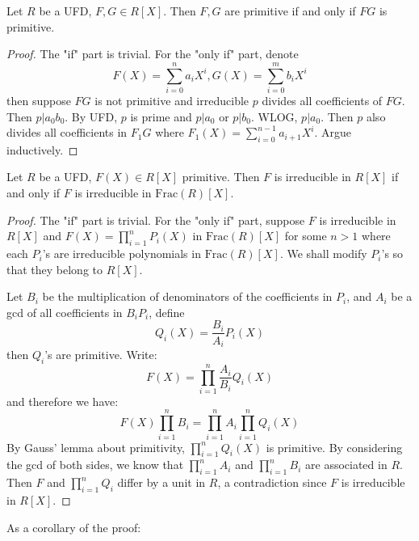 \documentclass{note-eng}
\begin{document}
\begin{lemma} \label{lem:gauss-primitivity}
    Let $R$ be a UFD, $F, G \in R[X]$. Then $F, G$ are primitive if and only if $FG$ is primitive.
\end{lemma}

\begin{proof}
    The "if" part is trivial. For the "only if" part, denote
    $$F(X) = \sum\limits_{i = 0}^{n} a_i X^i, G(X) = \sum\limits_{i = 0}^{m} b_i X^i$$
    then suppose $FG$ is not primitive and irreducible $p$ divides all coefficients of $FG$. Then $p | a_0b_0$. By UFD, $p$ is prime and $p | a_0$ or $p | b_0$. WLOG, $p | a_0$. Then $p$ also divides all coefficients in $F_1G$ where $F_1(X) = \sum\limits_{i = 0}^{n - 1}a_{i + 1}X^i$. Argue inductively.
\end{proof}

\begin{lemma} \label{lem:gauss-irreducible}
    Let $R$ be a UFD, $F(X) \in R[X]$ primitive. Then $F$ is irreducible in $R[X]$ if and only if $F$ is irreducible in $\mathrm{Frac}(R)[X]$.
\end{lemma}

\begin{proof}
    The "if" part is trivial. For the "only if" part, suppose $F$ is irreducible in $R[X]$ and $F(X) = \prod\limits_{i = 1}^{n}P_i(X)$ in $\mathrm{Frac}(R)[X]$ for some $n \gt 1$ where each $P_i$'s are irreducible polynomials in $\mathrm{Frac}(R)[X]$. We shall modify $P_i$'s so that they belong to $R[X]$.

    Let $B_i$ be the multiplication of denominators of the coefficients in $P_i$, and $A_i$ be a gcd of all coefficients in $B_i P_i$, define
    $$Q_i(X) = \frac{B_i}{A_i} P_i(X)$$
    then $Q_i$'s are primitive. Write:
    $$F(X) = \prod\limits_{i = 1}^{n} \frac{A_i}{B_i} Q_i(X)$$
    and therefore we have:
    $$F(X) \prod\limits_{i = 1}^{n} B_i = \prod\limits_{i = 1}^{n} A_i \prod\limits_{i = 1}^{n} Q_i(X)$$
    By Gauss' lemma about primitivity, $\prod\limits_{i = 1}^{n} Q_i(X)$ is primitive. By considering the gcd of both sides, we know that $\prod\limits_{i = 1}^{n} A_i$ and $\prod\limits_{i = 1}^{n} B_i$ are associated in $R$. Then $F$ and $\prod\limits_{i = 1}^{n} Q_i$ differ by a unit in $R$, a contradiction since $F$ is irreducible in $R[X]$.
\end{proof}

As a corollary of the proof:
\end{document}
